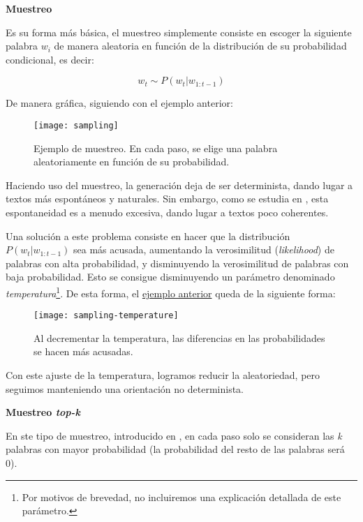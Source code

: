 \bigskip
\noindent
\textbf{Muestreo}

Es su forma más básica, el muestreo simplemente consiste en escoger la siguiente palabra $w_i$ de manera aleatoria en función de la distribución de su probabilidad condicional, es decir:

\[ w_t \sim P(w_t | w_{1:t-1}) \]

De manera gráfica, siguiendo con el ejemplo anterior:

\begin{figure}[!h]
	\centering
	\texttt{[image: sampling]}
	\caption[Ejemplo de muestreo.]{Ejemplo de muestreo. En cada paso, se elige una palabra aleatoriamente en función de su probabilidad.}
	\label{fig:muestreo}
\end{figure}

Haciendo uso del muestreo, la generación deja de ser determinista, dando lugar a textos más espontáneos y naturales. Sin embargo, como se estudia en \cite{holtzman20}, esta espontaneidad es a menudo excesiva, dando lugar a textos poco coherentes.

Una solución a este problema consiste en hacer que la distribución $P(w_t|w_{1:t-1})$ sea más acusada, aumentando la verosimilitud (\emph{likelihood}) de palabras con alta probabilidad, y disminuyendo la verosimilitud de palabras con baja probabilidad. Esto se consigue disminuyendo un parámetro denominado \emph{temperatura}\footnote{\hspace{0.06cm}Por motivos de brevedad, no incluiremos una explicación detallada de este parámetro.}. De esta forma, el \hyperref[fig:muestreo]{ejemplo anterior} queda de la siguiente forma:

\begin{figure}[!h]
	\centering
	\texttt{[image: sampling-temperature]}
	\caption[Ejemplo de muestreo con temperatura.]{Al decrementar la temperatura, las diferencias en las  probabilidades se hacen más acusadas.}
\end{figure}

Con este ajuste de la temperatura, logramos reducir la aleatoriedad, pero seguimos manteniendo una orientación no determinista.

\newpage

\bigskip
\noindent
\textbf{Muestreo \emph{top-k}}

En ste tipo de muestreo, introducido en \cite{fan18}, en cada paso solo se consideran las \emph{k} palabras con mayor probabilidad (la probabilidad del resto de las palabras será 0).


